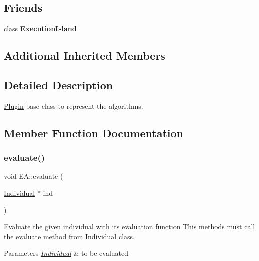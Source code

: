 \subsection*{Friends}
\begin{DoxyCompactItemize}
\item 
\mbox{\label{classEA_ab4c25820347b7b27b7e94132b313f4bf}} 
class {\bfseries Execution\+Island}
\end{DoxyCompactItemize}
\subsection*{Additional Inherited Members}


\subsection{Detailed Description}
\mbox{\hyperlink{classPlugin}{Plugin}} base class to represent the algorithms. 



\subsection{Member Function Documentation}
\mbox{\label{classEA_a65e719d5e3a3cff67139d1e81f092cec}} 
\subsubsection{\texorpdfstring{evaluate()}{evaluate()}}
{\footnotesize\ttfamily void E\+A\+::evaluate (\begin{DoxyParamCaption}\item[{\mbox{\hyperlink{classIndividual}{Individual}} $\ast$}]{ind }\end{DoxyParamCaption})}



Evaluate the given individual with its evaluation function This methods must call the evaluate method from \mbox{\hyperlink{classIndividual}{Individual}} class. 


\begin{DoxyParams}{Parameters}
{\em \mbox{\hyperlink{classIndividual}{Individual}}} & to be evaluated \\
\hline
\end{DoxyParams}
\mbox{\label{classEA_a6ab8cb75b4a102d91579a58ecb815f6c}} 
